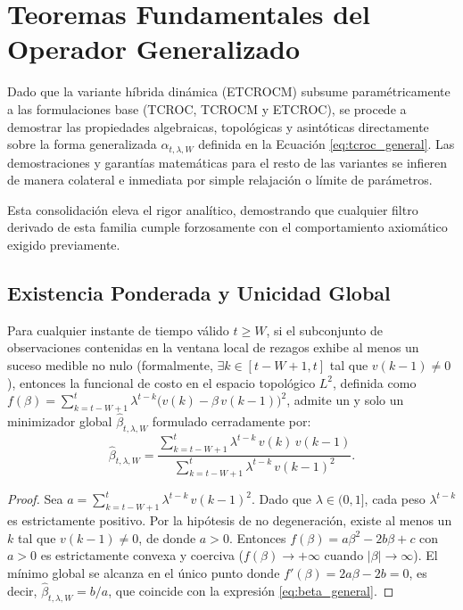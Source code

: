 
\section{Teoremas Fundamentales del Operador Generalizado}
\label{sec:tcroc_teoremas_generales}

Dado que la variante híbrida dinámica (ETCROCM) subsume paramétricamente a las formulaciones base (TCROC, TCROCM y ETCROC), se procede a demostrar las propiedades algebraicas, topológicas y asintóticas directamente sobre la forma generalizada \(\alpha_{t,\lambda,W}\) definida en la Ecuación \eqref{eq:tcroc_general}. Las demostraciones y garantías matemáticas para el resto de las variantes se infieren de manera colateral e inmediata por simple relajación o límite de parámetros.

Esta consolidación eleva el rigor analítico, demostrando que cualquier filtro derivado de esta familia cumple forzosamente con el comportamiento axiomático exigido previamente.

\subsection{Existencia Ponderada y Unicidad Global}
\label{subsec:teorema_existencia}

\begin{theorem}
\label{teo:existencia_general}
Para cualquier instante de tiempo válido \(t \geq W\), si el subconjunto de observaciones contenidas en la ventana local de rezagos exhibe al menos un suceso medible no nulo (formalmente, \(\exists k \in [t-W+1, t]\) tal que \(v(k-1) \neq 0\)), entonces la funcional de costo en el espacio topológico \(L^2\), definida como \(f(\beta) = \sum_{k=t-W+1}^{t} \lambda^{t-k} \bigl(v(k) - \beta\, v(k-1)\bigr)^2\), admite un y solo un minimizador global \(\hat{\beta}_{t,\lambda,W}\) formulado cerradamente por:
\begin{equation}
\hat{\beta}_{t,\lambda,W} = \frac{\displaystyle\sum_{k=t-W+1}^{t} \lambda^{t-k}\, v(k)\, v(k-1)}{\displaystyle\sum_{k=t-W+1}^{t} \lambda^{t-k}\, v(k-1)^2}.
\label{eq:beta_general}
\end{equation}
\end{theorem}

\begin{proof}
Sea $a = \sum_{k=t-W+1}^{t} \lambda^{t-k}\, v(k-1)^2$.  Dado que
$\lambda \in (0,1]$, cada peso $\lambda^{t-k}$ es estrictamente
positivo.  Por la hipótesis de no degeneración, existe al menos un
$k$ tal que $v(k-1) \neq 0$, de donde $a > 0$.  Entonces
$f(\beta) = a\beta^2 - 2b\beta + c$ con $a > 0$ es estrictamente
convexa y coerciva ($f(\beta) \to +\infty$ cuando
$|\beta| \to \infty$).  El mínimo global se alcanza en el único
punto donde $f'(\beta) = 2a\beta - 2b = 0$, es decir,
$\hat{\beta}_{t,\lambda,W} = b/a$, que coincide con la expresión
\eqref{eq:beta_general}.
\end{proof}

